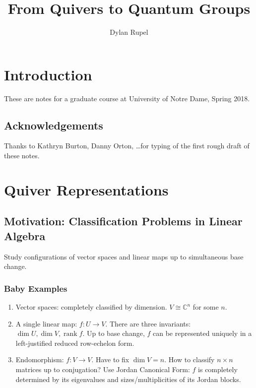 \documentclass{book}
\title{From Quivers to Quantum Groups}
\author{Dylan Rupel}
\DeclareMathOperator{\rank}{rank}
\begin{document}
  \maketitle

\chapter{Introduction}

  These are notes for a graduate course at University of Notre Dame, Spring 2018.

  \section{Acknowledgements}
  Thanks to Kathryn Burton, Danny Orton, \dots for typing of the first rough draft of these notes.

\chapter{Quiver Representations}

  \section{Motivation: Classification Problems in Linear Algebra}
  
  Study configurations of vector spaces and linear maps up to simultaneous base change.
  
  	\subsection{Baby Examples}
  		\begin{enumerate}
			\item Vector spaces: completely classified by dimension. $V \cong \mathbb{C}^n$ for some $n$.
			\item A single linear map: $f:U\to V$. There are three invariants: $\dim U, \dim V, \rank f$. Up to base change, $f$ can be represented uniquely in a left-justified reduced row-echelon form.
			\item Endomorphism: $f:V\to V$. Have to fix $\dim V=n$. How to classify $n\times n$ matrices up to conjugation? Use Jordan Canonical Form: $f$ is completely determined by its eigenvalues and sizes/multiplicities of its Jordan blocks. 
  		\end{enumerate}
\end{document}
